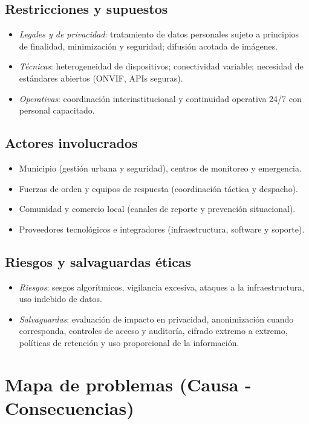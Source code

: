 \documentclass[12pt,a4paper]{article}
\begin{document}
\subsection*{Restricciones y supuestos}
\begin{itemize}
    \item \textit{Legales y de privacidad}: tratamiento de datos personales sujeto a principios de finalidad, minimización y seguridad; difusión acotada de imágenes.
    \item \textit{Técnicas}: heterogeneidad de dispositivos; conectividad variable; necesidad de estándares abiertos (ONVIF, APIs seguras).
    \item \textit{Operativas}: coordinación interinstitucional y continuidad operativa 24/7 con personal capacitado.
\end{itemize}

\subsection*{Actores involucrados}
\begin{itemize}
    \item Municipio (gestión urbana y seguridad), centros de monitoreo y emergencia.
    \item Fuerzas de orden y equipos de respuesta (coordinación táctica y despacho).
    \item Comunidad y comercio local (canales de reporte y prevención situacional).
    \item Proveedores tecnológicos e integradores (infraestructura, software y soporte).
\end{itemize}

\subsection*{Riesgos y salvaguardas éticas}
\begin{itemize}
    \item \textit{Riesgos}: sesgos algorítmicos, vigilancia excesiva, ataques a la infraestructura, uso indebido de datos.
    \item \textit{Salvaguardas}: evaluación de impacto en privacidad, anonimización cuando corresponda, controles de acceso y auditoría, cifrado extremo a extremo, políticas de retención y uso proporcional de la información.
\end{itemize}

\newpage
\section{Mapa de problemas (Causa - Consecuencias)}
\end{document}
